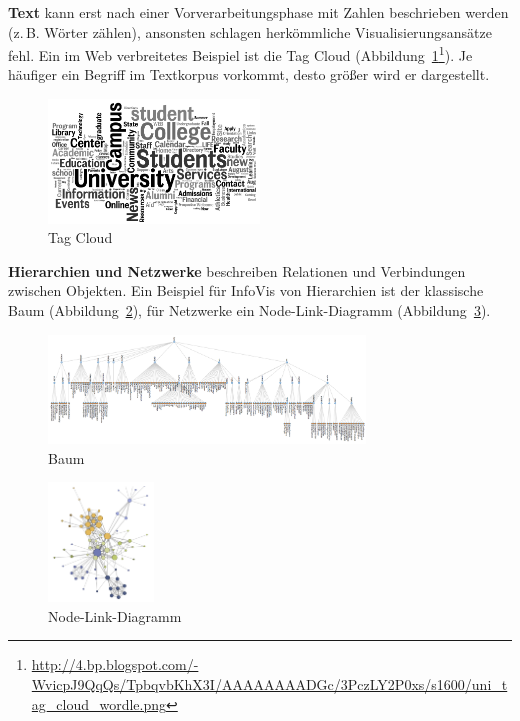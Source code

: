 \documentclass[
	headsepline,
	footsepline,
	fontsize=12pt,
	bibliography=totoc
]{scrbook}
\begin{document}
\textbf{Text} kann erst nach einer Vorverarbeitungsphase mit Zahlen beschrieben werden (z.\,B. Wörter zählen), ansonsten schlagen herkömmliche Visualisierungsansätze fehl. Ein im Web verbreitetes Beispiel ist die Tag Cloud (Abbildung~\ref{figure:tag_cloud}\footnote{\url{http://4.bp.blogspot.com/-WvicpJ9QqQs/TpbqvbKhX3I/AAAAAAAADGc/3PczLY2P0xs/s1600/uni_tag_cloud_wordle.png}}). Je häufiger ein Begriff im Textkorpus vorkommt, desto größer wird er dargestellt.

\begin{figure}[htbp]
   \centering
   \includegraphics[width=0.5\textwidth]{images/grundlagen-tag_cloud.png}
   \caption{Tag Cloud}
   \label{figure:tag_cloud}
\end{figure}

\textbf{Hierarchien und Netzwerke} beschreiben Relationen und Verbindungen zwischen Objekten. Ein Beispiel für InfoVis von Hierarchien ist der klassische Baum (Abbildung~\ref{figure:baum}), für Netzwerke ein Node-Link-Diagramm (Abbildung~\ref{figure:node-link-diagramm}).

\begin{figure}[htbp]
   \centering
   \includegraphics[width=0.75\textwidth]{images/grundlagen-baum.png}
   \caption{Baum}
   \label{figure:baum}
\end{figure}

\begin{figure}[htbp]
   \centering
   \includegraphics[width=0.25\textwidth]{images/grundlagen-node-link-diagramm.png}
   \caption{Node-Link-Diagramm}
   \label{figure:node-link-diagramm}
\end{figure}
\end{document}
